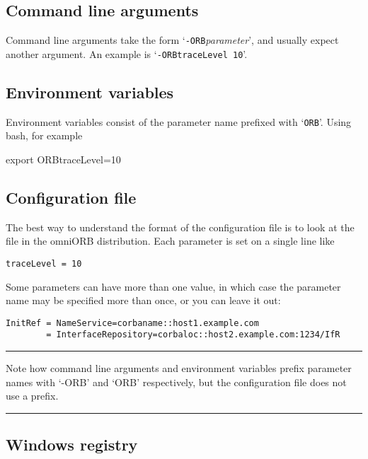\documentclass[11pt,twoside,a4paper]{book}
\newcommand{\cmdline}[1]{\texttt{#1}}
\newenvironment{statement}%
 {\noindent\begin{minipage}{\textwidth}%
  \vspace{.5\baselineskip}%
  \noindent\rule{\textwidth}{2pt}%
  \vspace{.25\baselineskip}%
  \begin{list}{}{\setlength{\listparindent}{0em}%
                 \setlength{\itemindent}{0em}%
                 \setlength{\leftmargin}{1.5em}%
                 \setlength{\rightmargin}{\leftmargin}%
                 \setlength{\topsep}{0pt}%
                 \setlength{\partopsep}{0pt}}
  \item\relax}
 {\end{list}%
  \vspace{-.25\baselineskip}%
  \noindent\rule{\textwidth}{2pt}%
  \vspace{.5\baselineskip}%
  \end{minipage}}
\newcommand{\file}{\begingroup \urlstyle{tt}\Url}
\begin{document}
\subsection{Command line arguments}
\label{sec:ORBargs}

Command line arguments take the form
`\cmdline{-ORB}\textit{parameter}', and usually expect another
argument. An example is `\cmdline{-ORBtraceLevel 10}'.


\subsection{Environment variables}

Environment variables consist of the parameter name prefixed with
`\cmdline{ORB}'. Using bash, for example

\begin{makelisting}
export ORBtraceLevel=10
\end{makelisting}


\subsection{Configuration file}

The best way to understand the format of the configuration file is to
look at the \file{sample.cfg} file in the omniORB distribution. Each
parameter is set on a single line like

\begin{verbatim}
traceLevel = 10
\end{verbatim}

Some parameters can have more than one value, in which case the
parameter name may be specified more than once, or you can leave it
out:

\begin{verbatim}
InitRef = NameService=corbaname::host1.example.com
        = InterfaceRepository=corbaloc::host2.example.com:1234/IfR
\end{verbatim}


\begin{statement}
Note how command line arguments and environment variables prefix
parameter names with `-ORB' and `ORB' respectively, but the
configuration file does not use a prefix.
\end{statement}


\subsection{Windows registry}
\end{document}
